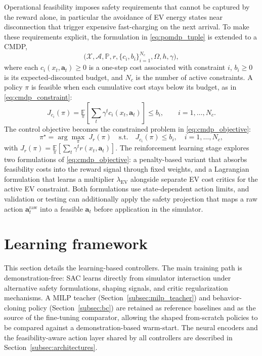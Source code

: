\documentclass[preprint,12pt, 3p]{elsarticle}
\begin{document}
Operational feasibility imposes safety requirements that cannot be captured by the reward alone, in particular the avoidance of \gls{EV} energy states near disconnection that trigger expensive fast-charging on the next arrival. To make these requirements explicit, the formulation in \eqref{eq:pomdp_tuple} is extended to a \gls{CMDP},
\begin{equation}
\label{eq:cmdp_tuple}
\bigl(\mathcal{X}, \mathcal{A}, \mathbb{P}, r, \{c_i, b_i\}_{i=1}^{N_c}, \Omega, h, \gamma\bigr),
\end{equation}
where each $c_i(x_t, \mathbf{a}_t) \geq 0$ is a one-step cost associated with constraint $i$, $b_i \geq 0$ is its expected-discounted budget, and $N_c$ is the number of active constraints. A policy $\pi$ is feasible when each cumulative cost stays below its budget, as in \eqref{eq:cmdp_constraint}:
\begin{equation}
\label{eq:cmdp_constraint}
J_{c_i}(\pi) = \underset{\pi}{\mathbb{E}}\!\left[\sum_{t} \gamma^t c_i(x_t,\mathbf{a}_t)\right] \leq b_i, \qquad i = 1,\dots, N_c.
\end{equation}
The control objective becomes the constrained problem in \eqref{eq:cmdp_objective}:
\begin{equation}
\label{eq:cmdp_objective}
\pi^\star = \arg\max_{\pi}\; J_r(\pi) \quad \text{s.t.}\quad J_{c_i}(\pi) \leq b_i, \quad i = 1,\dots,N_c,
\end{equation}
with $J_r(\pi) = \underset{\pi}{\mathbb{E}}[\sum_t \gamma^t r(x_t,\mathbf{a}_t)]$. The reinforcement learning stage explores two formulations of \eqref{eq:cmdp_objective}: a penalty-based variant that absorbs feasibility costs into the reward signal through fixed weights, and a Lagrangian formulation that learns a multiplier $\lambda_{\mathrm{EV}}$ alongside separate \gls{EV} cost critics for the active \gls{EV} constraint. Both formulations use state-dependent action limits, and validation or testing can additionally apply the safety projection that maps a raw action $\mathbf{a}^{\text{raw}}_t$ into a feasible $\mathbf{a}_t$ before application in the simulator.




\section{Learning framework}
\label{sec:learning_framework}

This section details the learning-based controllers. The main training path is demonstration-free: \gls{SAC} learns directly from simulator interaction under alternative safety formulations, shaping signals, and critic regularization mechanisms. A \gls{MILP} teacher (Section~\ref{subsec:milp_teacher}) and behavior-cloning policy (Section~\ref{subsec:bc}) are retained as reference baselines and as the source of the fine-tuning comparator, allowing the shaped from-scratch policies to be compared against a demonstration-based warm-start. The neural encoders and the feasibility-aware action layer shared by all controllers are described in Section~\ref{subsec:architectures}.
\end{document}
